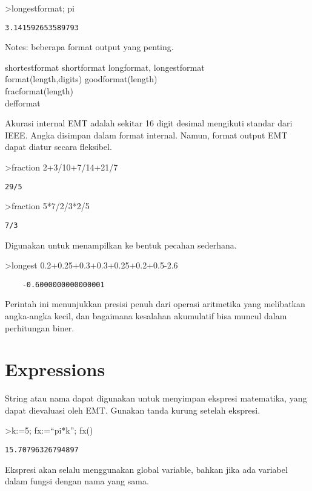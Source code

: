 \documentclass[
]{book}
\begin{document}
\textgreater longestformat; pi

\begin{verbatim}
3.141592653589793
\end{verbatim}

Notes: beberapa format output yang penting.

shortestformat shortformat longformat, longestformat\\
format(length,digits) goodformat(length)\\
fracformat(length)\\
defformat

Akurasi internal EMT adalah sekitar 16 digit desimal mengikuti standar dari IEEE. Angka disimpan dalam format internal. Namun, format output EMT dapat diatur secara fleksibel.

\textgreater fraction 2+3/10+7/14+21/7

\begin{verbatim}
29/5
\end{verbatim}

\textgreater fraction 5*7/2/3*2/5

\begin{verbatim}
7/3
\end{verbatim}

Digunakan untuk menampilkan ke bentuk pecahan sederhana.

\textgreater longest 0.2+0.25+0.3+0.3+0.25+0.2+0.5-2.6

\begin{verbatim}
    -0.6000000000000001 
\end{verbatim}

Perintah ini menunjukkan presisi penuh dari operasi aritmetika yang melibatkan angka-angka kecil, dan bagaimana kesalahan akumulatif bisa muncul dalam perhitungan biner.

\section{Expressions}\label{expressions}

String atau nama dapat digunakan untuk menyimpan ekspresi matematika, yang dapat dievaluasi oleh EMT. Gunakan tanda kurung setelah ekspresi.

\textgreater k:=5; fx:=``pi*k''; fx()

\begin{verbatim}
15.70796326794897
\end{verbatim}

Ekspresi akan selalu menggunakan global variable, bahkan jika ada variabel dalam fungsi dengan nama yang sama.
\end{document}
